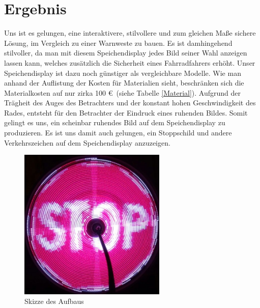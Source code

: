 \documentclass [a4paper, 11pt] {article}
\begin{document}
\section{Ergebnis}
Uns ist es gelungen, eine interaktivere, stilvollere und zum gleichen Maße sichere Lösung, im Vergleich zu einer Warnweste zu bauen. Es ist damhingehend stilvoller, da man mit diesem Speichendisplay jedes Bild seiner Wahl anzeigen lassen kann, welches zusätzlich die Sicherheit eines Fahrradfahrers erhöht.
Unser Speichendisplay ist dazu noch günstiger als vergleichbare Modelle. Wie man anhand der Auflistung der Kosten für Materialien sieht, beschränken sich die Materialkosten auf nur zirka 100 \euro\ (siehe Tabelle \ref{Material}). Aufgrund der Trägheit des Auges des Betrachters und der konstant hohen Geschwindigkeit des Rades, entsteht für den Betrachter der Eindruck eines ruhenden Bildes. Somit gelingt es uns, ein scheinbar ruhendes Bild auf dem Speichendisplay zu produzieren. Es ist uns damit auch gelungen, ein Stoppschild und andere Verkehrszeichen auf dem Speichendisplay anzuzeigen.
\begin{figure}[h]
	\centering
	\includegraphics[width=7cm]{Stopschild.png}
	\caption{Skizze des Aufbaus}
\end{figure}
\end{document}
